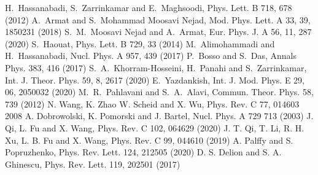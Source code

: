 \documentclass[12pt]{article}
\begin{document}
\begin{thebibliography}{99}
H.~Hassanabadi, S.~Zarrinkamar and E.~Maghsoodi, Phys. Lett. B  {718}, 678  (2012)
A.~Armat and S.~Mohammad Moosavi Nejad, Mod. Phys. Lett. A  {33},  39, 1850231 (2018)
S.~M.~Moosavi Nejad and A.~Armat, Eur. Phys. J. A  {56},  11, 287 (2020)
S.~Haouat, Phys. Lett. B {729}, 33 (2014)
 M.~Alimohammadi and H.~Hassanabadi, Nucl. Phys. A  {957}, 439  (2017)
P.~Bosso and S.~Das,
Annals Phys. {383}, 416 (2017)
 S.~A.~Khorram-Hosseini, H.~Panahi and S.~Zarrinkamar,  Int. J. Theor. Phys.  {59},  8, 2617 (2020)
E.~Yazdankish,
Int. J. Mod. Phys. E  {29}, 06, 2050032 (2020)
M.~R.~Pahlavani and S.~A.~Alavi,
Commun. Theor. Phys. {58}, 739  (2012)
N. Wang, K. Zhao W. Scheid and X. Wu, Phys. Rev. C 77, 014603   2008
A. Dobrowolski,  K. Pomorski and J. Bartel, Nucl. Phys. A 729 713 (2003)
J. Qi, L. Fu and X. Wang,
Phys. Rev. C 102, 064629 (2020)
 J. T. Qi, T. Li, R. H. Xu, L. B. Fu and X. Wang, Phys. Rev. C 99, 044610 (2019)
A. Palffy and S. Popruzhenko, Phys. Rev. Lett. 124,
212505 (2020)
 D. S. Delion and S. A. Ghinescu, Phys. Rev. Lett. 119,
202501 (2017)



 
\end{thebibliography}
\end{document}
